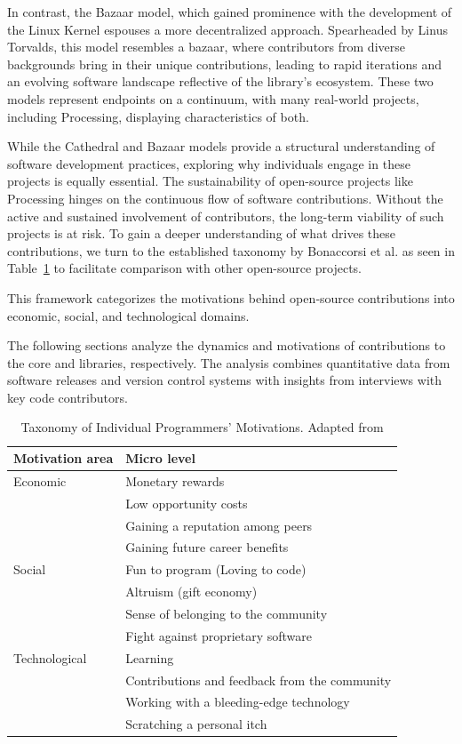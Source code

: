 In contrast, the Bazaar model, which gained prominence with the 
development of the Linux Kernel espouses a more decentralized approach. Spearheaded by Linus Torvalds, this model resembles a bazaar, where contributors from diverse backgrounds bring in their unique contributions, leading to rapid iterations and an evolving software landscape reflective of the library's ecosystem. 
These two models represent endpoints on a continuum, with many real-world projects, including Processing, displaying characteristics of both. 

While the Cathedral and Bazaar models provide a structural understanding of software development practices, exploring why individuals engage in these projects is equally essential. The sustainability of open-source projects like Processing hinges on the continuous flow of software contributions. Without the active and sustained involvement of contributors, the long-term viability of such projects is at risk. To gain a deeper understanding of what drives these contributions, we turn to the established taxonomy by Bonaccorsi et al. as seen in Table~\ref{tab:taxonomy} \parencite{bonaccorsiComparingMotivationsIndividual2006} to facilitate comparison with other open-source projects.

This framework categorizes the motivations behind open‐source
contributions into economic, social, and technological domains.

The following sections analyze the dynamics and motivations of contributions to the core and libraries, respectively. The analysis combines quantitative data from software releases and version control systems with insights from interviews with key code contributors.

\begin{table}
    \begin{tabularx}{\textwidth}{l l} 
    \toprule
    Motivation area & Micro level \\
    \midrule
    Economic & Monetary rewards \\
     & Low opportunity costs \\
     & Gaining a reputation among peers \\
     & Gaining future career benefits \\
    \midrule
    Social & Fun to program (Loving to code) \\
     & Altruism (gift economy) \\
     & Sense of belonging to the community \\
     & Fight against proprietary software \\
    \midrule
    Technological & Learning \\
     & Contributions and feedback from the community \\
     & Working with a bleeding-edge technology \\
     & Scratching a personal itch \\
    \bottomrule
    \end{tabularx} 
    \caption{Taxonomy of Individual Programmers’ Motivations. Adapted from \parencite{bonaccorsiComparingMotivationsIndividual2006}}
    \label{tab:taxonomy}

\end{table}

